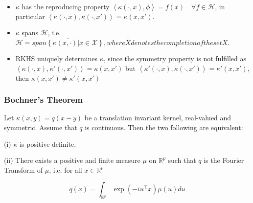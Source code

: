 {\begin{definition}
    \begin{itemize}
        \item $\kappa$ has the reproducing property $\left< \kappa(\cdot,x), \phi \right> = f(x) \quad \forall f \in \mathcal{H}$, in particular $\left< \kappa(\cdot,x), \kappa(\cdot,x') \right> = \kappa(x,x')$.
        \item $\kappa$ spans $\mathcal{H}$, i.e. $\mathcal{H} = \overline{span\left\{ \kappa\left( x,\cdot \right) | x \in \mathcal{X}\right\}}, where \overline{X} denotes the completion of the set X$.
        \item RKHS uniquely determines $\kappa$, since the symmetry property is not fulfilled as $\left< \kappa(\cdot,x), \kappa'(\cdot,x') \right> = \kappa(x,x')$ but $\left< \kappa'(\cdot,x), \kappa(\cdot,x') \right> = \kappa'(x,x')$, then $\kappa(x,x') \neq  \kappa'(x,x')$
    \end{itemize}
\end{definition}
}

\subsubsection{Bochner's Theorem}
\begin{theorem}
Let $\kappa(x, y)=q(x-y)$ be a translation invariant kernel, real-valued and symmetric. Assume that $q$ is continuous. Then the two following are equivalent:

(i) $\kappa$ is positive definite.

(ii) There exists a positive and finite measure $\mu$ on $\mathbb{R}^{p}$ such that $q$ is the Fourier Transform of $\mu$, i.e. for all $x \in \mathbb{R}^{p}$

\begin{equation}
q(x)=  \int_{\mathbb{R}^{p}} \exp\left({-i u^{\top} x} \right) \mu(u) du
\end{equation}
\end{theorem}

